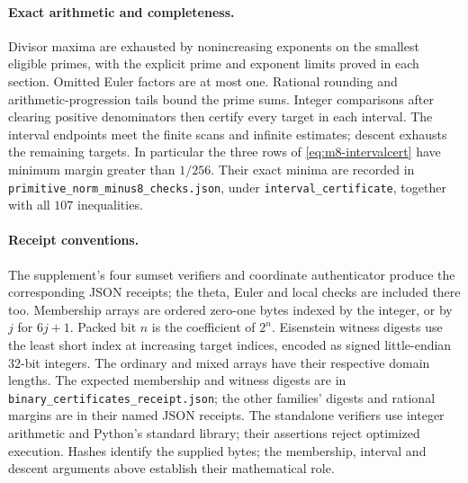 \paragraph{Exact arithmetic and completeness.}
Divisor maxima are exhausted by nonincreasing exponents on the
smallest eligible primes, with the explicit prime and exponent limits
proved in each section. Omitted Euler factors are at most one.
Rational rounding and arithmetic-progression tails bound the prime
sums. Integer comparisons after clearing positive denominators then
certify every target in each interval. The interval endpoints meet
the finite scans and infinite estimates; descent exhausts the
remaining targets.
In particular the three rows of \eqref{eq:m8-intervalcert} have
minimum margin greater than \(1/256\). Their exact minima are recorded
in \texttt{primitive\_norm\_minus8\_checks.json}, under
\texttt{interval\_certificate}, together with all \(107\) inequalities.

\paragraph{Receipt conventions.}
The supplement's four sumset verifiers and coordinate authenticator
produce the corresponding JSON receipts; the theta, Euler and local
checks are included there too. Membership arrays are ordered zero-one
bytes indexed by the integer, or by \(j\) for \(6j+1\).
Packed bit \(n\) is the coefficient of \(2^n\).
Eisenstein witness digests use the least short index at increasing
target indices, encoded as signed little-endian \(32\)-bit integers.
The ordinary and mixed arrays have their respective domain lengths.
The expected membership and witness digests are in
\texttt{binary\_certificates\_receipt.json}; the other families'
digests and rational margins are in their named JSON receipts.
The standalone verifiers use integer arithmetic and Python's standard
library; their assertions reject optimized execution.
Hashes identify the supplied bytes; the membership, interval and
descent arguments above establish their mathematical role.

